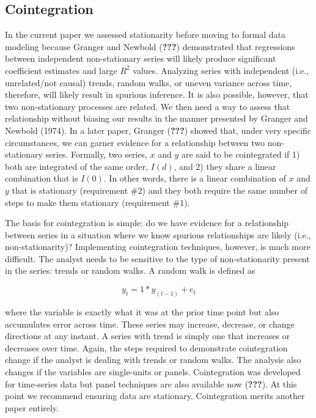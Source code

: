 \documentclass[english,,man]{apa6}
\theoremstyle{definition}
\theoremstyle{definition}
\theoremstyle{definition}
\theoremstyle{remark}
\begin{document}
\hypertarget{cointegration}{%
\subsection{Cointegration}\label{cointegration}}

In the current paper we assessed stationarity before moving to formal
data modeling because Granger and Newbold ({\textbf{???}}) demonstrated
that regressions between independent non-stationary series will likely
produce significant coefficient estimates and large \(R^2\) values.
Analyzing series with independent (i.e., unrelated/not causal) trends,
random walks, or uneven variance across time, therefore, will likely
result in spurious inference. It is also possible, however, that two
non-stationary processes are related. We then need a way to assess that
relationship without biasing our results in the manner presented by
Granger and Newbold (1974). In a later paper, Granger ({\textbf{???}})
showed that, under very specific circumstances, we can garner evidence
for a relationship between two non-stationary series. Formally, two
series, \(x\) and \(y\) are said to be cointegrated if 1) both are
integrated of the same order, \(I(d)\), and 2) they share a linear
combination that is \(I(0)\). In other words, there is a linear
combination of \(x\) and \(y\) that is stationary (requirement \#2) and
they both require the same number of steps to make them stationary
(requirement \#1).

The basis for cointegration is simple: do we have evidence for a
relationship between series in a situation where we know spurious
relationships are likely (i.e., non-stationarity)? Implementing
cointegration techniques, however, is much more difficult. The analyst
needs to be sensitive to the type of non-stationarity present in the
series: trends or random walks. A random walk is defined as

\begin{equation}
y_{t} = 1*y_{(t-1)} + e_{t}
\end{equation}

\noindent where the variable is exactly what it was at the prior time
point but also accumulates error across time. These series may increase,
decrease, or change directions at any instant. A series with trend is
simply one that increases or decreases over time. Again, the steps
required to demonstrate cointegration change if the analyst is dealing
with trends or random walks. The analysis also changes if the variables
are single-units or panels. Cointegration was developed for time-series
data but panel techniques are also available now ({\textbf{???}}). At
this point we recommend ensuring data are stationary. Cointegration
merits another paper entirely.
\end{document}
